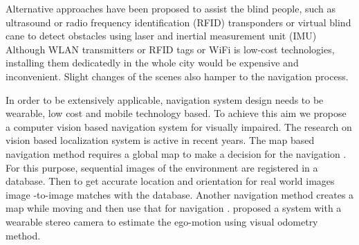 Alternative approaches have been proposed to assist the blind people, such as ultrasound \cite{drishti} or radio frequency identification (RFID) \cite{rfid} transponders or virtual blind cane to detect obstacles using laser and inertial measurement unit (IMU) \cite {virtual}
Although WLAN transmitters or RFID tags or WiFi is low-cost technologies, installing them dedicatedly in the whole city would be expensive and inconvenient.
Slight changes of the scenes also hamper to the navigation process.

In order to be extensively applicable, navigation system design needs to be wearable, low cost and mobile technology based.
To achieve this aim we propose a computer vision based navigation system for visually impaired.
The research on vision based localization system is active in recent years.
The map based navigation method requires a global map to make a decision for the navigation \cite{online,map,map2}.
For this purpose, sequential images of the environment are registered in a database.
Then to get accurate location and orientation for real world images image -to-image matches with the database.
Another navigation method creates a map while moving and then use that for navigation \cite{fly,fly2,fly3}. 
\cite{visual} proposed a system with a wearable stereo camera to estimate the ego-motion using visual odometry method.

